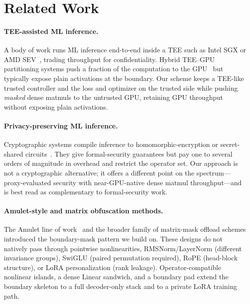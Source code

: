 \section{Related Work}
\label{sec:related}

\paragraph{TEE-assisted ML inference.}
A body of work runs ML inference end-to-end inside a TEE such as Intel SGX or AMD SEV~\cite{hunt2018chiron, kunkel2019tensorscone}, trading throughput for confidentiality. Hybrid TEE--GPU partitioning systems push a fraction of the computation to the GPU~\cite{tramer2019slalom, volos2018graviton} but typically expose plain activations at the boundary. Our scheme keeps a TEE-like trusted controller and the loss and optimizer on the trusted side while pushing \emph{masked} dense matmuls to the untrusted GPU, retaining GPU throughput without exposing plain activations.

\paragraph{Privacy-preserving ML inference.}
Cryptographic systems compile inference to homomorphic-encryption or secret-shared circuits~\cite{dowlin2016cryptonets, juvekar2018gazelle, mishra2020delphi, mohassel2017secureml, liu2017minionn}. They give formal-security guarantees but pay one to several orders of magnitude in overhead and restrict the operator set. Our approach is not a cryptographic alternative; it offers a different point on the spectrum---proxy-evaluated security with near-GPU-native dense matmul throughput---and is best read as complementary to formal-security work.

\paragraph{Amulet-style and matrix obfuscation methods.}
The Amulet line of work~\cite{amulet2024todo} and the broader family of matrix-mask offload schemes introduced the boundary-mask pattern we build on. These designs do not natively pass through pointwise nonlinearities, RMSNorm/LayerNorm (different invariance groups), SwiGLU (paired permutation required), RoPE (head-block structure), or LoRA personalization (rank leakage). Operator-compatible nonlinear islands, a dense Linear sandwich, and a boundary pad extend the boundary skeleton to a full decoder-only stack and to a private LoRA training path.

